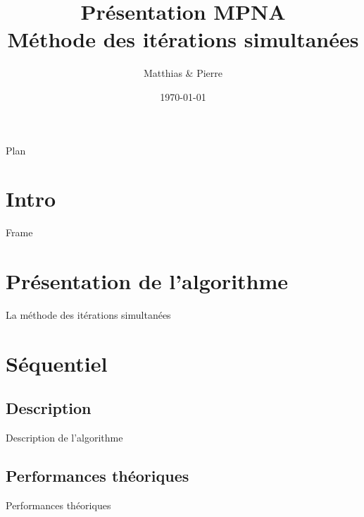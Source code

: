 \documentclass[9.5pt]{beamer}
\title[MPNA : MIS]{Présentation MPNA \\Méthode des itérations simultanées}
\author[\bsc{Beaupère} \& \bsc{Granger}]{Matthias \bsc{Beaupère} \& Pierre \bsc{Granger}}
\institute{M2 CHPS}
\date{\today}
\begin{document}

\begin{frame}
  \titlepage
\end{frame}

\begin{frame}{Plan}
	\tableofcontents[hideallsubsections]
\end{frame}

\section{Intro}
	\begin{frame}{Frame}

	\end{frame}

\section{Présentation de l'algorithme}
	\begin{frame}{La méthode des itérations simultanées}

	\end{frame}

\section{Séquentiel}
	\subsection{Description}
		\begin{frame}{Description de l'algorithme}

		\end{frame}

	\subsection{Performances théoriques}
		\begin{frame}{Performances théoriques}

		\end{frame}
\end{document}
